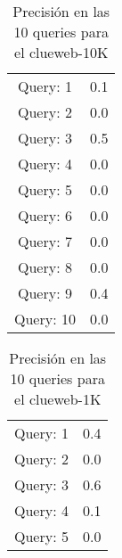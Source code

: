 \begin{table}[hbtp]
\centering
\begin{tabular}{cc}
Query: 1&0.1
\\
Query: 2&0.0
\\
Query: 3&0.5
\\
Query: 4&0.0
\\
Query: 5&0.0
\\
Query: 6&0.0
\\
Query: 7&0.0
\\
Query: 8&0.0
\\
Query: 9&0.4
\\
Query: 10&0.0
\\
\end{tabular}
\caption{Precisi\'{o}n en las 10 queries para el clueweb-10K}
\end{table}
\begin{table}[hbtp]
\centering
\begin{tabular}{cc}
Query: 1&0.4
\\
Query: 2&0.0
\\
Query: 3&0.6
\\
Query: 4&0.1
\\
Query: 5&0.0
\\
\end{tabular}
\caption{Precisi\'{o}n en las 10 queries para el clueweb-1K}
\end{table}
